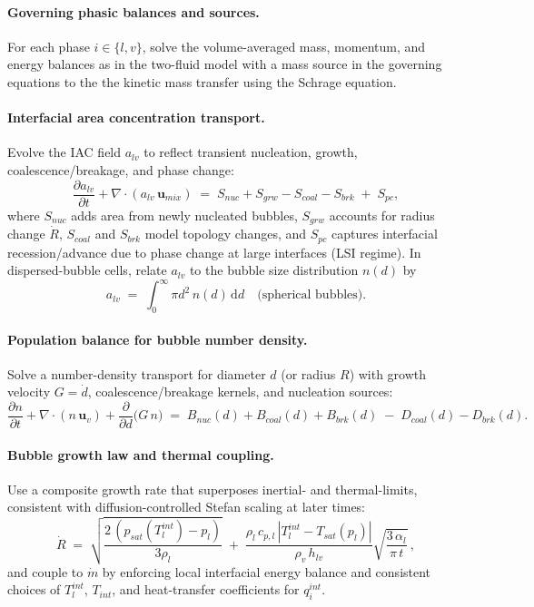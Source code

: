 \paragraph{Governing phasic balances and sources.}
For each phase \(i\in\{l,v\}\), solve the volume-averaged mass, 
momentum, and energy balances as in the two-fluid model with a mass source in the governing equations to the 
the kinetic mass transfer using the Schrage equation. 

\paragraph{Interfacial area concentration transport.}
Evolve the IAC field \(a_{lv}\) to reflect transient nucleation, growth, coalescence/breakage, and phase change:%
\[
\frac{\partial a_{lv}}{\partial t} + \nabla\cdot(a_{lv}\,\boldsymbol{u}_{mix})
\;=\; S_{nuc} + S_{grw} - S_{coal} - S_{brk} \;+\; S_{pc},%
\]
where \(S_{nuc}\) adds area from newly nucleated bubbles, \(S_{grw}\) accounts for radius change \( \dot{R}\), \(S_{coal}\) and \(S_{brk}\) model topology changes, and \(S_{pc}\) captures interfacial recession/advance due to phase change at large interfaces (LSI regime).%
In dispersed-bubble cells, relate \(a_{lv}\) to the bubble size distribution \(n(d)\) by%
\[
a_{lv} \;=\; \int_0^\infty \pi d^2\,n(d)\,\mathrm{d}d
\quad\text{(spherical bubbles)}.%
\]

\paragraph{Population balance for bubble number density.}
Solve a number-density transport for diameter \(d\) (or radius \(R\)) with growth velocity \(G=\dot{d}\), 
coalescence/breakage kernels, and nucleation sources:%
\[
\frac{\partial n}{\partial t} + \nabla\cdot(n\,\boldsymbol{u}_v) + \frac{\partial}{\partial d}\!\bigl(G\,n\bigr)
\;=\; B_{nuc}(d) + B_{coal}(d) + B_{brk}(d) \;-\; D_{coal}(d) - D_{brk}(d).%
\]


\paragraph{Bubble growth law and thermal coupling.}
Use a composite growth rate that superposes inertial- and thermal-limits, consistent with diffusion-controlled Stefan scaling at later times:%
\[
\dot{R} \;=\; 
\sqrt{\frac{2\,(p_{sat}(T_l^{int})-p_l)}{3\rho_l}}
\;+\; 
\frac{\rho_l\,c_{p,l}\,|T_l^{int}-T_{sat}(p_l)|}{\rho_v\,h_{lv}}
\sqrt{\frac{3\,\alpha_l}{\pi\,t}}\,,
\]
and couple to \(\dot{m}\) by enforcing local interfacial energy balance and consistent choices of \(T_l^{int}\), \(T_{int}\), and heat-transfer coefficients for \(q_i^{int}\).%


